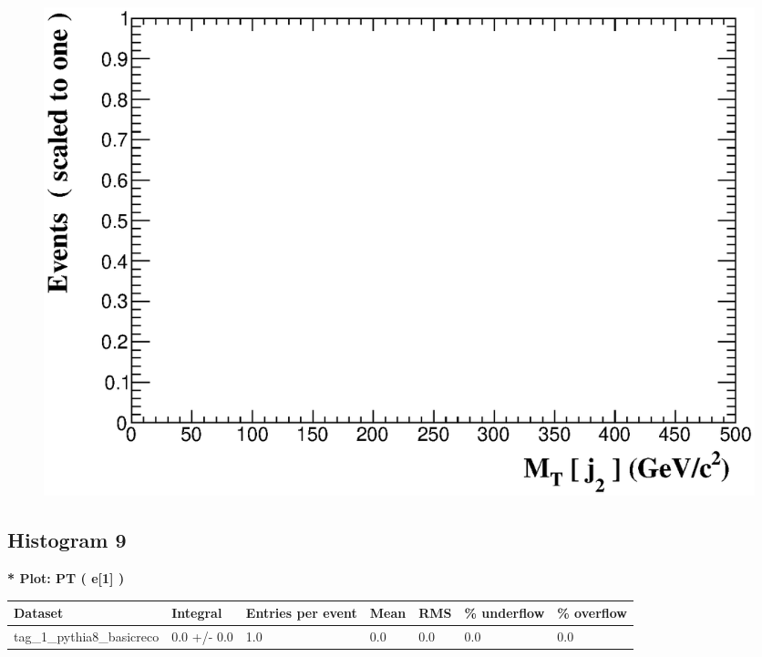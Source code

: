 \documentclass[a4paper, 10pt]{article}
\begin{document}
\begin{figure}[H]
  \begin{center}
    \includegraphics[scale=0.45]{selection_7.eps}\\
\caption{   }
  \end{center}
\end{figure}
      \newpage
\subsection{ Histogram 9}

\textbf{* Plot: PT ( e[1] ) }\\
   \begin{table}[H]
  \begin{center}
    \begin{tabular}{|m{23.0mm}|m{23.0mm}|m{18.0mm}|m{19.0mm}|m{19.0mm}|m{19.0mm}|m{19.0mm}|}
      \hline
      {\cellcolor{yellow}         Dataset}& {\cellcolor{yellow}         Integral}& {\cellcolor{yellow}         Entries per event}& {\cellcolor{yellow}         Mean}& {\cellcolor{yellow}         RMS}& {\cellcolor{yellow}         \% underflow}& {\cellcolor{yellow}         \% overflow}\\
      \hline
      {\cellcolor{white}         tag\_1\_pythia8\_basicreco}& {\cellcolor{white}         0.0 +/\-- 0.0}& {\cellcolor{white}         1.0}& {\cellcolor{white}         0.0}& {\cellcolor{white}         0.0}& {\cellcolor{green}         0.0}& {\cellcolor{green}         0.0}\\
\hline
    \end{tabular}
  \end{center}
\end{table}
\end{document}
